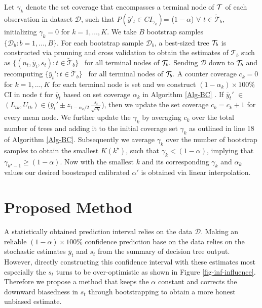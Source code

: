 Let $\gamma_k$ denote the set coverage that encompasses a terminal node of $\mathcal{T}$ of each observation in dataset $\mathcal{D}$, such that $P(\bar{y}'_t \in CI_{\gamma_k})$= ($1- \alpha$) $\forall$ $t\in \widetilde{\mathcal{T}}_b$, initializing $\gamma_k = 0$ for $k =1, \ldots, K$. We take $B$ bootstrap samples $\{ \mathcal{D}_b: b=1, \ldots, B\}.$ For each bootstrap sample $\mathcal{D}_b$, a best-sized tree $\mathcal{T}_b$ is constructed  via prunning and cross validation to obtain the estimates of $\mathcal{T}_b$ such as $\{(n_t, \bar{y}_t, s_t): t \in \widetilde{\mathcal{T}}_b\}$ \ for all terminal nodes of $\mathcal{T}_b.$ Sending $\mathcal{D}$ down to $\mathcal{T}_b$ and recomputing $\{ \bar{y}_t': t \in \widetilde{\mathcal{T}}_b\}$ \ for all terminal nodes of $\mathcal{T}_b.$ A counter coverage $c_{k}=0$ for $k =1, \ldots, K$ for each terminal node is set and we construct $(1-\alpha_k) \times 100\%$ CI in node $t$ for $\bar{y}_t$ based on set coverage $\alpha_k$ in Algorithm \ref{Alg-BC} . If $\bar{y}_t'$ $\in$ $(L_{tk}, U_{tk}) \in (\bar{y}_t' \pm z_{1-\alpha_k/2} \, \frac{\displaystyle s_t}{\displaystyle \sqrt{n_t}}$), then we update the set coverage {$c_k = c_k  +1$} for every mean node. We further update the $\gamma_k$ by averaging $c_k$ over the total number of trees and adding it to the initial coverage set $\gamma_k$ as outlined in line 18 of Algorithm \ref{Alg-BC}. Subsequently we average $\gamma_k$ over the number of bootstrap samples to obtain the smallest $K(k^\star)$, such that $\gamma_k < (1- \alpha)$, implying that $\gamma_{k^\star -1} \geq (1-\alpha)$. Now with  the  smallest $k$ and its corresponding $\gamma_k$ and $\alpha_k$ values our desired boostraped calibrated $\alpha'$ is obtained via linear interpolation. 



\section{Proposed  Method}
A statistically obtained prediction interval relies on the data $\mathcal{D}$. Making an reliable $(1-\alpha) \times 100\%$ confidence prediction base on the data relies on the stochastic estimates $\bar{y}_t$ and $s_t$ from the summary of decision tree output.  However, directly constructing this confidence interval with these estimates most especially the $s_t$ turns to be over-optimistic as shown in Figure \ref{fig-inf-influence}. Therefore we propose a method that keeps the $\alpha$ constant and corrects the downward biasedness in $s_t$ through bootstrapping to obtain a more honest unbiased estimate.


